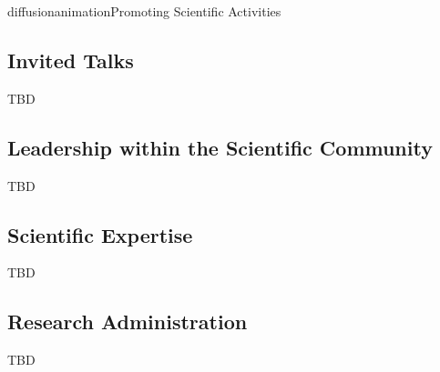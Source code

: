 \documentclass{ra2016}
\begin{document}
\begin{module}{diffusion}{animation}{Promoting Scientific Activities}
\begin{itemize}
\end{itemize}
    
\subsection{Invited Talks}

TBD
\subsection{Leadership within the Scientific Community}
TBD

\subsection{Scientific Expertise}

TBD

\subsection{Research Administration}
 
 TBD
 
\end{module}
\end{document}
